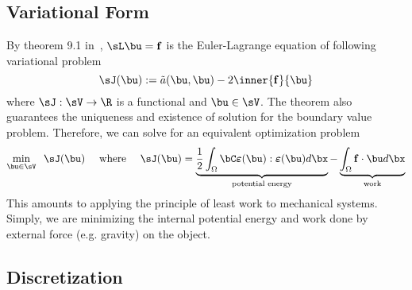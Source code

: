\documentclass[11pt,titlepage]{article}
\newcommand{\bepsilon}{\boldsymbol{\varepsilon}}
\renewcommand{\bf}{\mathbf{f}}
\newcommand{\ta}{\tilde{a}}
\begin{document}

\subsection{Variational Form}
By theorem 9.1 in~\cite{iserles_2009}, $\sL \bu = \bf$ is the Euler-Lagrange equation of following variational problem
\[
    \sJ(\bu) := \ta(\bu,\bu) - 2\inner{\bf}{\bu}
\]
where $\sJ: \sV\to \R$ is a functional and $\bu\in\sV$. The theorem also guarantees the uniqueness and existence of solution for the boundary value problem. Therefore, we can solve for an equivalent optimization problem
\[
    \min_{\bu\in \sV} \;\; \sJ(\bu)
    \quad \text{ where } \quad
    \sJ(\bu) = 
        \underbrace{\frac{1}{2}\int_{\Omega} \bC \bepsilon(\bu) : \bepsilon(\bu) d\bx }_\text{potential energy}
      - \underbrace{\int_{\Omega} \bf \cdot\bu d\bx}_\text{work}
\]
This amounts to applying the principle of least work to mechanical systems. Simply, we are minimizing the internal potential energy and work done by external force (e.g. gravity) on the object.


\subsection{Discretization}
\end{document}
